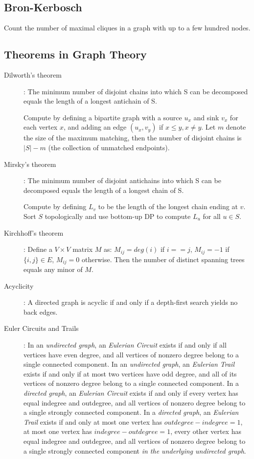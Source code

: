 \documentclass[
	a4paper,
	landscape
	article
]{article}
\newcommand{\entry}[5]{
	\subsection{#1}
	#2

	\ifthenelse{\equal{#4}{}}{}{\noindent\textbf{Complexity:} #4}

	\ifthenelse{\equal{#5}{}}{}{\noindent\textbf{Dependencies:} #5}
	
}
\begin{document}
\entry{Bron-Kerbosch}
{Count the number of maximal cliques in a graph with up to a few hundred nodes.}
{./snippets/graphs/bronkerbosch.cpp}
{$O(3^{\nicefrac n3})$}{}


\subsection{Theorems in Graph Theory}
\begin{description}
	\item[Dilworth's theorem]:
		The minimum number of disjoint chains into which S can be decomposed equals the length of a longest antichain of S.

		Compute by defining a bipartite graph with a source $u_x$ and sink $v_x$ for each vertex $x$, and adding an edge $(u_x, v_y)$ if $x \leq y, x \neq y$. Let $m$ denote the size of the maximum matching, then the number of disjoint chains is $|S| - m$ (the collection of unmatched endpoints).

	\item[Mirsky's theorem]:
		The minimum number of disjoint antichains into which S can be decomposed equals the length of a longest chain of S.

		Compute by defining $L_v$ to be the length of the longest chain ending at $v$. Sort $S$ topologically and use bottom-up DP to compute $L_u$ for all $u \in S$.

	\item[Kirchhoff's theorem]:
		Define a $V \times V$ matrix $M$ as: $M_{ij} = deg(i)$ if $i == j$, $M_{ij} = - 1$ if $\{i, j\} \in E$, $M_{ij} = 0$ otherwise. Then the number of distinct spanning trees equals any minor of $M$.

	\item[Acyclicity]:
		A directed graph is acyclic if and only if a depth-first search yields no back edges.

	\item[Euler Circuits and Trails]:
		In an \textit{undirected graph}, an \textit{Eulerian Circuit} exists if and only if all vertices have even degree, and all vertices of nonzero degree belong to a single connected component. In an \textit{undirected graph}, an \textit{Eulerian Trail} exists if and only if at most two vertices have odd degree, and all of its vertices of nonzero degree belong to a single connected component. In a \textit{directed graph}, an \textit{Eulerian Circuit} exists if and only if every vertex has equal indegree and outdegree, and all vertices of nonzero degree belong to a single strongly connected component. In a \textit{directed graph}, an \textit{Eulerian Trail} exists if and only at most one vertex has $outdegree - indegree = 1$, at most one vertex has $indegree - outdegree = 1$, every other vertex has equal indegree and outdegree, and all vertices of nonzero degree belong to a single strongly connected component \textit{in the underlying undirected graph}.
\end{description}
\end{document}
